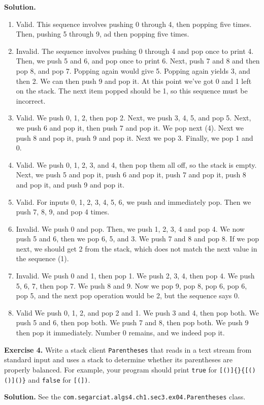 \documentclass[12pt, a4paper]{article}
\newenvironment{ex}[2][Exercise]
{\par\medskip\noindent \textbf{#1 #2.}}
{\medskip}
\newenvironment{sol}[1][Solution]
{\par\medskip\noindent \textbf{#1.} }
{\medskip}
\begin{document}
	\begin{sol}
		\
		\begin{enumerate}[label=(\alph*)]
			\item Valid. This sequence involves pushing 0 through 4, then popping five times.
			Then, pushing 5 through  9, ad then popping five times.
			\item Invalid. The sequence involves pushing 0 through 4 and pop once to print 4. Then,
			we push 5 and 6, and pop once to print 6. Next, push 7 and 8 and then pop 8,
			and pop 7. Popping again would give 5. Popping again yields 3, and then 2.
			We can then push 9 and pop it. At this point we've got 0 and 1 left on the stack.
			The next item popped should be 1, so this sequence must be incorrect.
			\item Valid. We push 0, 1, 2, then pop 2. Next, we push 3, 4, 5, and pop 5. Next,
			we push 6 and pop it, then push 7 and pop it. We pop next (4). Next we
			push 8 and pop it, push 9 and pop it. Next we pop 3. Finally, we pop 1 and 0.
			\item Valid. We push 0, 1, 2, 3, and 4, then pop them all off, so the stack is empty.
			Next, we push 5 and pop it, push 6 and pop it, push 7 and pop it, push 8 and pop it,
			and push 9 and pop it.
			\item Valid. For inputs 0, 1, 2, 3, 4, 5, 6, we push and immediately pop. Then we
			push 7, 8, 9, and pop 4 times.
			\item Invalid. We push 0 and pop. Then, we push 1, 2, 3, 4 and pop 4. We now push 5 and 6,
			then we pop 6, 5, and 3. We push 7 and 8 and pop 8. If we pop next, we should get
			2 from the stack, which does not match the next value in the sequence (1).
			\item Invalid. We push 0 and 1, then pop 1. We push 2, 3, 4, then pop 4. We push 5, 6, 7,
			then pop 7. We push 8 and 9. Now we pop 9, pop 8, pop 6, pop 6, pop 5, and
			the next pop operation would be 2, but the sequence says 0.
			\item Valid We push 0, 1, 2, and pop 2 and 1. We push 3 and 4, then pop both. We push
			5 and 6, then pop both. We push 7 and 8, then pop both. We push 9 then pop it immediately.
			Number 0 remains, and we indeed pop it.
		\end{enumerate}
	\end{sol}
	
	\begin{ex}{4}
		Write a stack client \texttt{Parentheses} that reads in a text stream from standard
		input and uses a stack to determine whether its parentheses are properly balanced.
		For example, your program should print \texttt{true} for \texttt{[()]\{\}\{[()()]()\}}
		and \texttt{false} for \texttt{[(])}.
	\end{ex}
	\begin{sol}
		See the \texttt{com.segarciat.algs4.ch1.sec3.ex04.Parentheses} class.
	\end{sol}
\end{document}
